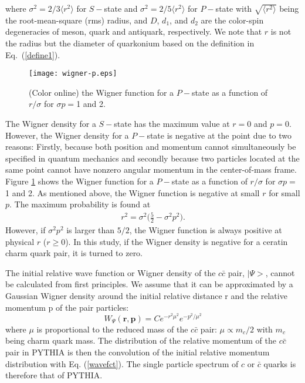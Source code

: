 \documentclass[twocolumn,aps,superscriptaddress,showpacs,nofootinbib,floatfix]{revtex4}
\newcommand{\com}[1]{{\sf\color[rgb]{0,0,1}{#1}}}
\renewcommand\sout{\bgroup \color{red} \ULdepth=-.5ex \ULset}
\newcommand{\be}{\begin{equation}}
\newcommand{\ee}{\end{equation}}
\begin{document}
where $\sigma^2=2/3\langle r^2\rangle$ for $S-$state and $\sigma^2=2/5\langle r^2\rangle$ for $P-$state with $\sqrt{\langle r^2\rangle}$ being the root-mean-square (rms) radius, and
$D$, $d_1$, and $d_2$ are the color-spin degeneracies of meson, quark and antiquark, respectively.
We note that $r$ is not the radius but the diameter of quarkonium based on the definition in Eq.~(\ref{define1}).
\begin{figure}[!h]
\centerline{
\texttt{[image: wigner-p.eps]}}
\caption{(Color online) the Wigner function for a $P-$state as a function of $r/\sigma$ for $\sigma p=$1 and 2.}
\label{wigner-p}
\end{figure}

The Wigner density for a $S-$state has the maximum value at $r=0$ and $p=0$.
However, the Wigner density for a $P-$state is negative at the point due to two reasons:
Firstly,  because both position and momentum cannot simultaneously be specified in quantum mechanics and secondly
because two particles located at the same point cannot have nonzero angular momentum in the center-of-mass frame.
Figure \ref{wigner-p} shows the Wigner function for a $P-$state as a function of $r/\sigma$ for $\sigma p=$1 and 2.
As mentioned above, the Wigner function is negative at small $r$ for small $p$.
The maximum probability is found at
\begin{eqnarray}
r^2=\sigma^2\bigg(\frac{5}{2}-\sigma^2p^2\bigg).
\label{pmax}
\end{eqnarray}
However, if $\sigma^2p^2$ is larger than $5/2$,
the Wigner function is always positive at physical $r$ ($r\ge 0$).
In this study, if the Wigner density is negative for a ceratin charm quark pair, it is turned to zero.


The initial relative wave function or Wigner density of the $c \bar c$ pair, $|\Psi>$, cannot be calculated from first principles. We assume that it can be approximated by a Gaussian Wigner density around the initial relative distance r and the relative momentum p of the pair particles:
\be
W_\Psi(\mathbf{r,p})= C e^{-r^2\mu^2}e^{-p^2 /\mu^2}
\label{wavefct}
\ee
where $\mu $ is proportional to the reduced mass of the $c \bar c$ pair: $\mu \propto m_c/2$ with $m_c$ being charm quark mass. The distribution of the relative momentum of the $c \bar c$ pair in PYTHIA is then the convolution of the initial relative momentum distribution with Eq. (\ref{wavefct}). The single particle spectrum  of $c$ or $\bar c$ quarks is therefore that of PYTHIA.
\end{document}
